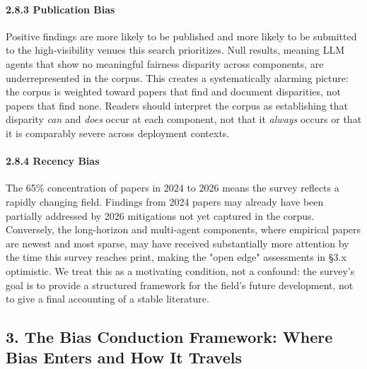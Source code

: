 \documentclass[10pt]{article}
\begin{document}
\paragraph*{2.8.3 Publication Bias}

Positive findings are more likely to be published and more likely to be submitted to the high-visibility venues this search prioritizes. Null results, meaning LLM agents that show no meaningful fairness disparity across components, are underrepresented in the corpus. This creates a systematically alarming picture: the corpus is weighted toward papers that find and document disparities, not papers that find none. Readers should interpret the corpus as establishing that disparity \emph{can} and \emph{does} occur at each component, not that it \emph{always} occurs or that it is comparably severe across deployment contexts.

\paragraph*{2.8.4 Recency Bias}

The 65\% concentration of papers in 2024 to 2026 means the survey reflects a rapidly changing field. Findings from 2024 papers may already have been partially addressed by 2026 mitigations not yet captured in the corpus. Conversely, the long-horizon and multi-agent components, where empirical papers are newest and most sparse, may have received substantially more attention by the time this survey reaches print, making the "open edge" assessments in \S{}3.x optimistic. We treat this as a motivating condition, not a confound: the survey's goal is to provide a structured framework for the field's future development, not to give a final accounting of a stable literature.



\subsection*{3. The Bias Conduction Framework: Where Bias Enters and How It Travels}
\end{document}
